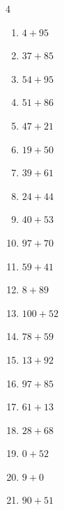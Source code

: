 \begin{multicols}{4}
\begin{enumerate}
  \item $4+95$
        \phantom{$=99$}

  \item $37+85$
        \phantom{$=122$}

  \item $54+95$
        \phantom{$=149$}

  \item $51+86$
        \phantom{$=137$}

  \item $47+21$
        \phantom{$=68$}

  \item $19+50$
        \phantom{$=69$}

  \item $39+61$
        \phantom{$=100$}

  \item $24+44$
        \phantom{$=68$}

  \item $40+53$
        \phantom{$=93$}

\columnbreak %

  \item $97+70$
        \phantom{$=167$}

  \item $59+41$
        \phantom{$=100$}

  \item $8+89$
        \phantom{$=97$}

  \item $100+52$
        \phantom{$=152$}

  \item $78+59$
        \phantom{$=137$}

  \item $13+92$
        \phantom{$=105$}

  \item $97+85$
        \phantom{$=182$}

  \item $61+13$
        \phantom{$=74$}

  \item $28+68$
        \phantom{$=96$}

  \item $0+52$
        \phantom{$=52$}

  \item $9+0$
        \phantom{$=9$}

  \item $90+51$
        \phantom{$=141$}


\end{enumerate}
\end{multicols}
